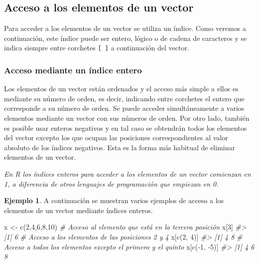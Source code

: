 \documentclass[
]{book}
\newenvironment{Shaded}{\begin{snugshade}}{\end{snugshade}}
\newcommand{\CommentTok}[1]{\textcolor[rgb]{0.56,0.35,0.01}{\textit{#1}}}
\newcommand{\DecValTok}[1]{\textcolor[rgb]{0.00,0.00,0.81}{#1}}
\newcommand{\FunctionTok}[1]{\textcolor[rgb]{0.00,0.00,0.00}{#1}}
\newcommand{\NormalTok}[1]{#1}
\newcommand{\OtherTok}[1]{\textcolor[rgb]{0.56,0.35,0.01}{#1}}
\newcommand{\SpecialCharTok}[1]{\textcolor[rgb]{0.00,0.00,0.00}{#1}}
\theoremstyle{definition}
\theoremstyle{definition}
\newtheorem{example}{Ejemplo}[chapter]
\theoremstyle{definition}
\theoremstyle{definition}
\theoremstyle{remark}
\begin{document}
\hypertarget{acceso-a-los-elementos-de-un-vector}{%
\subsection{Acceso a los elementos de un vector}\label{acceso-a-los-elementos-de-un-vector}}

Para acceder a los elementos de un vector se utiliza un índice. Como veremos a continuación, este índice puede ser entero, lógico o de cadena de caracteres y se indica siempre entre corchetes \texttt{{[}\ {]}} a continuación del vector.

\hypertarget{acceso-mediante-un-uxedndice-entero}{%
\subsubsection{Acceso mediante un índice entero}\label{acceso-mediante-un-uxedndice-entero}}

Los elementos de un vector están ordenados y el acceso más simple a ellos es mediante su número de orden, es decir, indicando entre corchetes el entero que corresponde a su número de orden. Se puede acceder simultáneamente a varios elementos mediante un vector con sus números de orden. Por otro lado, también es posible usar enteros negativos y en tal caso se obtendrán todos los elementos del vector excepto los que ocupan las posiciones correspondientes al valor absoluto de los índices negativos. Esta es la forma más habitual de eliminar elementos de un vector.

\emph{En R los índices enteros para acceder a los elementos de un vector comienzan en 1, a diferencia de otros lenguajes de programación que empiezan en 0.}

\begin{example}

A continuación se muestran varios ejemplos de acceso a los elementos de un vector mediante índices enteros.

\begin{Shaded}
\begin{Highlighting}[]
\NormalTok{x }\OtherTok{\textless{}{-}} \FunctionTok{c}\NormalTok{(}\DecValTok{2}\NormalTok{,}\DecValTok{4}\NormalTok{,}\DecValTok{6}\NormalTok{,}\DecValTok{8}\NormalTok{,}\DecValTok{10}\NormalTok{)}
\CommentTok{\# Acceso al elemento que está en la tercera posición}
\NormalTok{x[}\DecValTok{3}\NormalTok{]}
\CommentTok{\#\textgreater{} [1] 6}
\CommentTok{\# Acceso a los elementos de las posiciones 2 y 4}
\NormalTok{x[}\FunctionTok{c}\NormalTok{(}\DecValTok{2}\NormalTok{, }\DecValTok{4}\NormalTok{)]}
\CommentTok{\#\textgreater{} [1] 4 8}
\CommentTok{\# Acceso a todos los elementos excepto el primero y el quinto}
\NormalTok{x[}\FunctionTok{c}\NormalTok{(}\SpecialCharTok{{-}}\DecValTok{1}\NormalTok{, }\SpecialCharTok{{-}}\DecValTok{5}\NormalTok{)]}
\CommentTok{\#\textgreater{} [1] 4 6 8}
\end{Highlighting}
\end{Shaded}

\end{example}
\end{document}
